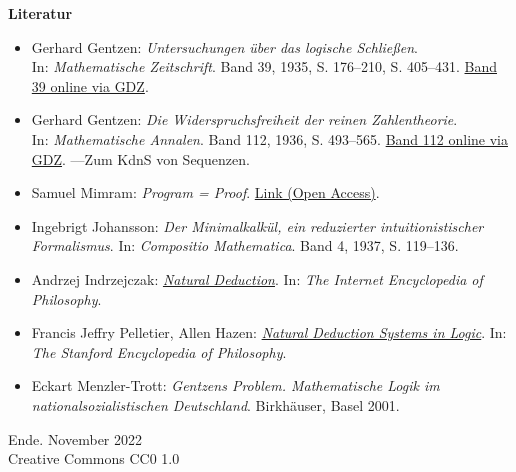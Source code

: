 \documentclass[8pt]{beamer}
\newcommand{\modest}[1]{{\small\color{gray}#1}}
\newcommand{\strong}[1]{\textsf{\textbf{#1}}}
\begin{document}
\begin{frame}[t]
\vspace{3em}
\strong{Literatur}
\begin{itemize}
\item Gerhard Gentzen: \emph{Untersuchungen über das logische Schließen}.\\
In: \emph{Mathematische Zeitschrift}. Band 39, 1935, S. 176--210, S. 405--431.
\href{https://gdz.sub.uni-goettingen.de/id/PPN266833020_0039}{Band 39 online via GDZ}.
\item Gerhard Gentzen: \emph{Die Widerspruchsfreiheit der reinen
Zahlentheorie}.\\
In: \emph{Mathematische Annalen}. Band 112, 1936, S. 493--565.
\href{https://gdz.sub.uni-goettingen.de/id/PPN235181684_0112}{Band 112 online via GDZ}.
---Zum KdnS von Sequenzen.
\item Samuel Mimram: \emph{Program = Proof}.
\href{https://www.lix.polytechnique.fr/Labo/Samuel.Mimram/publications/}{Link (Open Access)}.
\item Ingebrigt Johansson: \emph{Der Minimalkalkül, ein reduzierter
intuitionistischer Formalismus}. In: \emph{Compositio Mathematica}.
Band 4, 1937, S. 119--136.
\item Andrzej Indrzejczak: \href{https://iep.utm.edu/natural-deduction/}{\emph{Natural Deduction}}.
In: \emph{The Internet Encyclopedia of Philosophy}.
\item Francis Jeffry Pelletier, Allen Hazen:
\href{https://plato.stanford.edu/entries/natural-deduction/}{\emph{Natural Deduction Systems in Logic}}.
In: \emph{The Stanford Encyclopedia of Philosophy}.
\item Eckart Menzler-Trott: \emph{Gentzens Problem. Mathematische Logik
  im nationalsozialistischen Deutschland}. Birkhäuser, Basel 2001.
\end{itemize}
\end{frame}

\begin{frame}
Ende.
\vfill\hfill\modest{November 2022}\\
\hfill\modest{Creative Commons CC0 1.0}
\end{frame}
\end{document}
